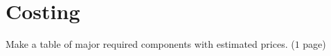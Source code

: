 
\chapter{Costing}
\label{Chapter10}

Make a table of major required components with estimated prices. ($1$ page)